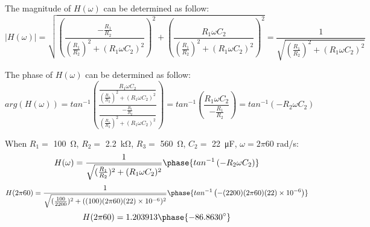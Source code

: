 \documentclass{article}
\begin{document}
The magnitude of $H(\omega)$ can be determined as follow:
$$|H(\omega)|=\sqrt{\left(\frac{-\frac{R_1}{R_2}}{(\frac{R_1}{R_2})^2+(R_1\omega C_2)^2}\right)^2+\left(\frac{R_1\omega C_2}{(\frac{R_1}{R_2})^2+(R_1\omega C_2)^2}\right)^2}=\frac{1}{\sqrt{(\frac{R_1}{R_2})^2+(R_1\omega C_2)^2}}$$

\newpage

The phase of $H(\omega)$ can be determined as follow:
$$arg\left(H(\omega)\right)=tan^{-1}\left(\frac{\frac{R_1\omega C_2}{(\frac{R_1}{R_2})^2+(R_1\omega C_2)^2}}{\frac{-\frac{R_1}{R_2}}{(\frac{R_1}{R_2})^2+(R_1\omega C_2)^2}}\right)=tan^{-1}\left(\frac{R_1\omega C_2}{-\frac{R_1}{R_2}}\right)=tan^{-1}\left(-R_2\omega C_2\right)$$

When $R_1 =$ \SI{100}{\ohm}, $R_2 = $ \SI{2.2}{\kilo\ohm}, $R_3 = $ \SI{560}{\ohm}, $C_2 = $ \SI{22}{\micro\farad}, $\omega = 2\pi60$ rad/s:
$$H(\omega)=\frac{1}{\sqrt{(\frac{R_1}{R_2})^2+(R_1\omega C_2)^2}}\phase{tan^{-1}\left(-R_2\omega C_2\right)}$$
$$H(2\pi60)=\frac{1}{\sqrt{(\frac{100}{2200})^2+((100)(2\pi60)(22)\times10^{-6})^2}}\phase{tan^{-1}\left(-(2200)(2\pi60)(22)\times10^{-6}\right)}$$
$$H(2\pi60)=1.203913\phase{-86.8630^{\circ}}$$


\printbibliography
\end{document}
